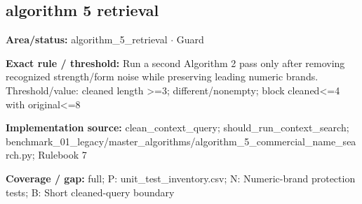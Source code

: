 \subsection*{algorithm 5 retrieval}
\begin{tcolorbox}[enhanced,breakable,colback=white,colframe=Muted!45,boxrule=0.45pt,arc=1.5pt,left=6pt,right=6pt,top=5pt,bottom=5pt,title={\texttt{A5-CONTEXT-CLEAN-02}},title after break={\texttt{A5-CONTEXT-CLEAN-02}\ (continued)},fonttitle=\headingfont\bfseries\color{Navy},coltitle=Navy]
\textbf{Area/status:} algorithm\_\allowbreak{}5\_\allowbreak{}retrieval $\boldsymbol{\cdot}$ Guard\par
\smallskip
\textbf{Exact rule / threshold:} Run a second Algorithm 2 pass only after removing recognized strength/\allowbreak{}form noise while preserving leading numeric brands. Threshold/\allowbreak{}value: cleaned length >=3; different/\allowbreak{}nonempty; block cleaned<=4 with original<=8\par
\smallskip
\textbf{Implementation source:} clean\_\allowbreak{}context\_\allowbreak{}query; should\_\allowbreak{}run\_\allowbreak{}context\_\allowbreak{}search; benchmark\_\allowbreak{}01\_\allowbreak{}legacy/\allowbreak{}master\_\allowbreak{}algorithms/\allowbreak{}algorithm\_\allowbreak{}5\_\allowbreak{}commercial\_\allowbreak{}name\_\allowbreak{}search.py; Rulebook 7\par
\smallskip
\textbf{Coverage / gap:} full; P: unit\_\allowbreak{}test\_\allowbreak{}inventory.csv; N: Numeric-brand protection tests; B: Short cleaned-query boundary
\end{tcolorbox}
\medskip
